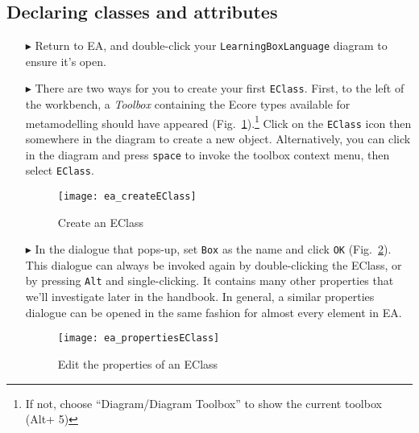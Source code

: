 \newpage
\subsection{Declaring classes and attributes}
\visHeader
\hypertarget{static:classes vis}{}

\begin{itemize}

\item[$\blacktriangleright$] Return to EA, and double-click your \texttt{LearningBoxLanguage} diagram to ensure it's open.

\vspace{0.5cm}

\item[$\blacktriangleright$] There are two ways for you to create your first \texttt{EClass}. First, to the left of the workbench, a \emph{Toolbox} containing
the Ecore types available for metamodelling should have appeared (Fig.~\ref{ea:eclass}).\footnote{If not, choose ``Diagram/Diagram Toolbox'' to show the
current toolbox (Alt+ 5)} Click on the \texttt{EClass} icon then somewhere in the diagram to create a new object. Alternatively, you can click in the diagram and press
\texttt{space} to invoke the toolbox context menu, then select \texttt{EClass}.

\vspace{0.5cm}

\begin{figure}[htbp]
	\centering
  \texttt{[image: ea\_createEClass]}
	\caption{Create an EClass}
	\label{ea:eclass}
\end{figure}

\vspace{0.5cm}

\item[$\blacktriangleright$] In the dialogue that pops-up, set \texttt{Box} as the name and click \texttt{OK} (Fig.~\ref{ea:eclass_properties}).
This dialogue can always be invoked again by double-clicking the EClass, or by pressing \texttt{Alt} and single-clicking. It contains many other properties that we'll investigate later in the handbook. In general, a similar properties dialogue can be opened in the same fashion for almost every element in EA.

\clearpage

\begin{figure}[ht]
	\centering
  \texttt{[image: ea\_propertiesEClass]}
	\caption{Edit the properties of an EClass}
	\label{ea:eclass_properties}
\end{figure}


\end{itemize}
